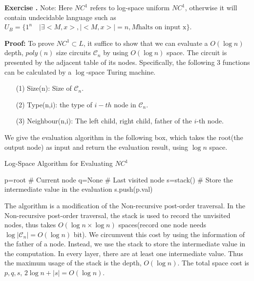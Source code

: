 \documentclass[a4paper]{article}
\newenvironment{exercise}[1]{
	\par
	\noindent\textbf{Exercise #1.}\quad
}{
	\par
	\bigskip
}
\begin{document}
\begin{exercise}{6.14}
\textbf{Note:} Here $NC^1$ refers to log-space uniform $NC^1$, otherwise it will contain undecidable language such as $U_B=\{1^n\quad | \exists <M,x>, |<M,x>|=n, M\text{halts on input x}\}$.

\textbf{Proof:} To prove $NC^1\subset L$, it suffice to show that we can evaluate a $O(\log n)$ depth, $poly(n)$ size circuits $\mathcal{C}_n$ by using $O(\log n)$ space. The circuit is presented by the adjacent table of its nodes. Specifically, the following 3 functions can be calculated by a $\log$-space Turing machine.
\begin{itemize}
\item[(1)] Size(n): Size of $\mathcal{C}_n$.
\item[(2)] Type(n,i): the type of $i-th$ node in $\mathcal{C}_n$.
\item[(3)] Neighbour(n,i): The left child, right child, father of the $i$-th node.
\end{itemize} 
We give the evaluation algorithm in the following box, which takes the root(the output node) as input and return   
the evaluation result, using $\log n$ space. 

\begin{algorithm}[h!]
\caption{Log-Space Algorithm for Evaluating $NC^1$}
p=root \# Current node\;
q=None \# Last visited node\;
s=stack() \# Store the intermediate value in the evaluation\;
s.push(p.val)\;
\end{algorithm}


    The algorithm is a modification of the Non-recursive post-order traversal. In the Non-recursive post-order traversal, the stack is used to record the unvisited nodes, thus takes $O(\log n\times\log n)$ spaces(record one node needs $\log |\mathcal{C}_n|=O(\log n)$ bit). We circumvent this cost by using the information of the father of a node. Instead, we use the stack to store the intermediate value in the computation. In every layer, there are at least one intermediate value. Thus the maximum usage of the stack is the depth, $O(\log n)$. The total space cost is $p,q,s$, $2\log n+|s|=O(\log n)$.
\end{exercise}
\end{document}
